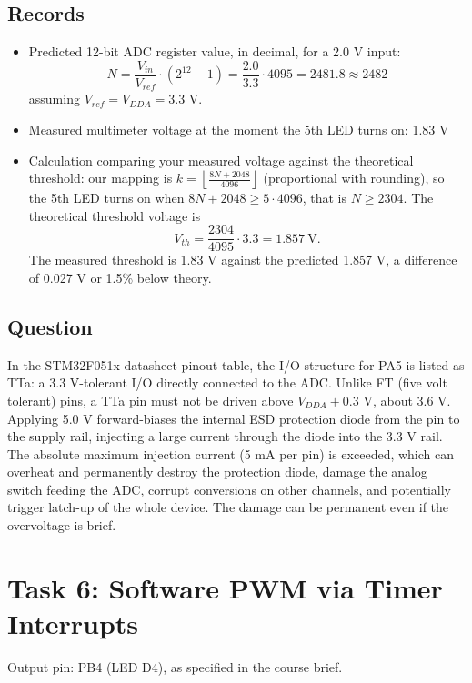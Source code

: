 \documentclass[11pt]{article}
\begin{document}
\subsection{Records}
\begin{itemize}
    \item Predicted 12-bit ADC register value, in decimal, for a 2.0 V input:
    \[
        N = \frac{V_{in}}{V_{ref}} \cdot (2^{12} - 1) = \frac{2.0}{3.3} \cdot 4095 = 2481.8 \approx 2482
    \]
    assuming $V_{ref} = V_{DDA} = 3.3$ V.
    \item Measured multimeter voltage at the moment the 5th LED turns on: 1.83 V
    \item Calculation comparing your measured voltage against the theoretical threshold: our mapping is $k = \left\lfloor \frac{8N + 2048}{4096} \right\rfloor$ (proportional with rounding), so the 5th LED turns on when $8N + 2048 \geq 5 \cdot 4096$, that is $N \geq 2304$. The theoretical threshold voltage is
    \[
        V_{th} = \frac{2304}{4095} \cdot 3.3 = 1.857~\text{V}.
    \]
    The measured threshold is 1.83 V against the predicted 1.857 V, a difference of 0.027 V or 1.5\% below theory.
\end{itemize}

\subsection{Question}
In the STM32F051x datasheet pinout table, the I/O structure for PA5 is listed as TTa: a 3.3 V-tolerant I/O directly connected to the ADC. Unlike FT (five volt tolerant) pins, a TTa pin must not be driven above $V_{DDA} + 0.3$ V, about 3.6 V. Applying 5.0 V forward-biases the internal ESD protection diode from the pin to the supply rail, injecting a large current through the diode into the 3.3 V rail. The absolute maximum injection current (5 mA per pin) is exceeded, which can overheat and permanently destroy the protection diode, damage the analog switch feeding the ADC, corrupt conversions on other channels, and potentially trigger latch-up of the whole device. The damage can be permanent even if the overvoltage is brief.

\section{Task 6: Software PWM via Timer Interrupts}

Output pin: PB4 (LED D4), as specified in the course brief.
\end{document}
